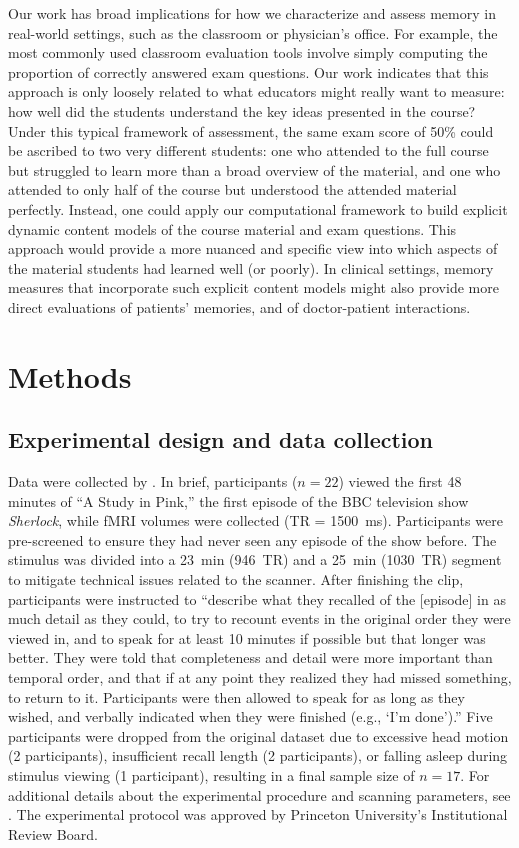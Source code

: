\documentclass[10pt]{article}
\begin{document}
Our work has broad implications for how we characterize and assess memory in real-world settings, such as the classroom or physician's office.  For example, the most commonly used classroom evaluation tools involve simply computing the proportion of correctly answered exam questions.  Our work indicates that this approach is only loosely related to what educators might really want to measure: how well did the students understand the key ideas presented in the course?  Under this typical framework of assessment, the same exam score of 50\% could be ascribed to two very different students: one who attended to the full course but struggled to learn more than a broad overview of the material, and one who attended to only half of the course but understood the attended material perfectly.  Instead, one could apply our computational framework to build explicit dynamic content models of the course material and exam questions.  This approach would provide a more nuanced and specific view into which aspects of the material students had learned well (or poorly).  In clinical settings, memory measures that incorporate such explicit content models might also provide more direct evaluations of patients' memories, and of doctor-patient interactions.


\section*{Methods}
\label{sec:methods}

\subsection*{Experimental design and data collection}
Data were collected by \cite{ChenEtal17}.  In brief, participants ($n=22$) viewed the first 48 minutes of ``A Study in Pink,'' the first episode of the BBC television show \textit{Sherlock}, while fMRI volumes were collected (TR = 1500~ms).  Participants were pre-screened to ensure they had never seen any episode of the show before.  The stimulus was divided into a 23~min (946~TR) and a 25~min (1030~TR) segment to mitigate technical issues related to the scanner.  After finishing the clip, participants were instructed to \citep[quoting from][]{ChenEtal17} ``describe what they recalled of the [episode] in as much detail as they could, to try to recount events in the original order they were viewed in, and to speak for at least 10 minutes if possible but that longer was better. They were told that completeness and detail were more important than temporal order, and that if at any point they realized they had missed something, to return to it. Participants were then allowed to speak for as long as they wished, and verbally indicated when they were finished (e.g., `I’m done').''  Five participants were dropped from the original dataset due to excessive head motion (2 participants), insufficient recall length (2 participants), or falling asleep during stimulus viewing (1 participant), resulting in a final sample size of $n=17$.  For additional details about the experimental procedure and scanning parameters, see \cite{ChenEtal17}.  The experimental protocol was approved by Princeton University's Institutional Review Board.
\end{document}
